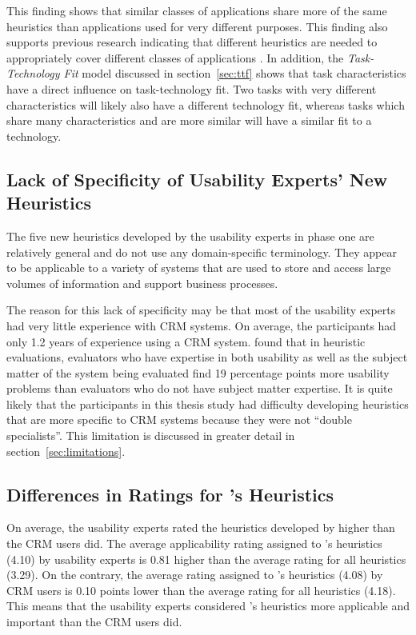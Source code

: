 This finding shows that similar classes of applications share more of the same heuristics than applications used for very different purposes. This finding also supports previous research indicating that different heuristics are needed to appropriately cover different classes of applications \citep[e.g.][]{Rusu2011}. In addition, the \textit{Task-Technology Fit} model discussed in section~\ref{sec:ttf} shows that task characteristics have a direct influence on task-technology fit. Two tasks with very different characteristics will likely also have a different technology fit, whereas tasks which share many characteristics and are more similar will have a similar fit to a technology.

\subsection{Lack of Specificity of Usability Experts' New Heuristics}
The five new heuristics developed by the usability experts in phase one are relatively general and do not use any domain-specific terminology. They appear to be applicable to a variety of systems that are used to store and access large volumes of information and support business processes.

The reason for this lack of specificity may be that most of the usability experts had very little experience with CRM systems. On average, the participants had only 1.2 years of experience using a CRM system.  found that in heuristic evaluations, evaluators who have expertise in both usability as well as the subject matter of the system being evaluated find 19 percentage points more usability problems than evaluators who do not have subject matter expertise. It is quite likely that the participants in this thesis study had difficulty developing heuristics that are more specific to CRM systems because they were not ``double specialists''. This limitation is discussed in greater detail in section~\ref{sec:limitations}.

\subsection{Differences in Ratings for \citeauthor{Nielsen1994a}'s Heuristics}
On average, the usability experts rated the heuristics developed by \citet{Nielsen1994a} higher than the CRM users did. The average applicability rating assigned to \citeauthor{Nielsen1994a}'s heuristics (4.10) by usability experts is 0.81 higher than the average rating for all heuristics (3.29). On the contrary, the average rating assigned to \citeauthor{Nielsen1994a}'s heuristics (4.08) by CRM users is 0.10 points lower than the average rating for all heuristics (4.18). This means that the usability experts considered \citeauthor{Nielsen1994a}'s heuristics more applicable and important than the CRM users did.

